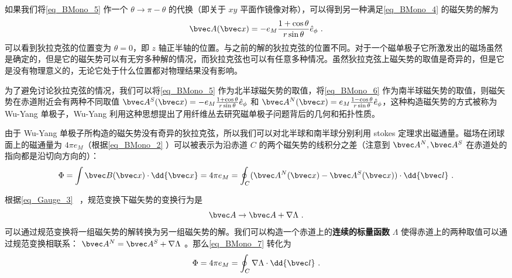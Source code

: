 如果我们将\autoref{eq_BMono_5} 作一个 $\theta\rightarrow \pi-\theta$ 的代换（即关于 $xy$ 平面作镜像对称），可以得到另一种满足\autoref{eq_BMono_4} 的磁矢势的解为
\begin{equation}\label{eq_BMono_6}
\bvec A(\bvec x)=-e_M\frac{1+\cos\theta}{r\sin\theta}
\hat e_\phi~.
\end{equation}
可以看到狄拉克弦的位置变为 $\theta=0$，即 $z$ 轴正半轴的位置。与之前的解的狄拉克弦的位置不同。对于一个磁单极子它所激发出的磁场虽然是确定的，但是它的磁矢势可以有无穷多种解的情况，而狄拉克弦也可以有任意多种情况。虽然狄拉克弦上磁矢势的取值是奇异的，但是它是没有物理意义的，无论它处于什么位置都对物理结果没有影响。

为了避免讨论狄拉克弦的情况，我们可以将\autoref{eq_BMono_5} 作为北半球磁矢势的取值，将\autoref{eq_BMono_6} 作为南半球磁矢势的取值，则磁矢势在赤道附近会有两种不同取值 $\bvec A^S(\bvec x)=-e_M\frac{1+\cos\theta}{r\sin\theta}
\hat e_\phi$ 和 $\bvec A^N(\bvec x)=e_M \frac{1-\cos\theta}{r\sin\theta} \hat e_\phi$，这种构造磁矢势的方式被称为 Wu-Yang 单极子，Wu-Yang 利用这种思想提出了用纤维丛去研究磁单极子问题背后的几何和拓扑性质。

由于 Wu-Yang 单极子所构造的磁矢势没有奇异的狄拉克弦，所以我们可以对北半球和南半球分别利用 stokes 定理求出磁通量。磁场在闭球面上的磁通量为 $4\pi e_M$（根据\autoref{eq_BMono_2} ）可以被表示为沿赤道 $C$ 的两个磁矢势的线积分之差（注意到 $\bvec A^N,\bvec A^S$ 在赤道处的指向都是沿切向方向的）：
\begin{equation}\label{eq_BMono_7}
\Phi = \int \bvec B(\bvec x) \cdot \dd{\bvec x} = 4\pi  e_M = \oint_C (\bvec A^N(\bvec x)-\bvec A^S(\bvec x)) \cdot \dd{\bvec l} ~.
\end{equation}

根据\autoref{eq_Gauge_3}~ ，规范变换下磁矢势的变换行为是
\begin{equation}
\bvec A\rightarrow \bvec A+\nabla \Lambda~.
\end{equation}
可以通过规范变换将一组磁矢势的解转换为另一组磁矢势的解。我们可以构造一个赤道上的\textbf{连续的标量函数} $\Lambda$ 使得赤道上的两种取值可以通过规范变换相联系： $\bvec A^N = \bvec A^S + \nabla\Lambda$ 。那么\autoref{eq_BMono_7} 转化为
\begin{equation}\label{eq_BMono_8}
\Phi = 4\pi e_M = \oint_C \nabla\Lambda \cdot \dd{\bvec l} ~.
\end{equation}

